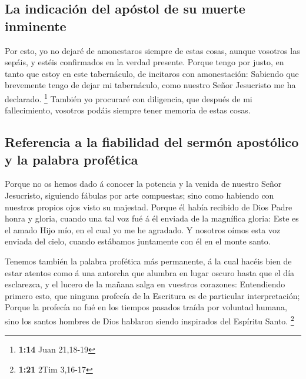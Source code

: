 \hypertarget{la-indicaciuxf3n-del-apuxf3stol-de-su-muerte-inminente}{%
\subsection{La indicación del apóstol de su muerte
inminente}\label{la-indicaciuxf3n-del-apuxf3stol-de-su-muerte-inminente}}

 Por esto, yo no dejaré de amonestaros siempre de estas
cosas, aunque vosotros las sepáis, y estéis confirmados en la verdad
presente.  Porque tengo por justo, en tanto que estoy en
este tabernáculo, de incitaros con amonestación: 
Sabiendo que brevemente tengo de dejar mi tabernáculo, como nuestro
Señor Jesucristo me ha declarado. \footnote{\textbf{1:14} Juan 21,18-19}
 También yo procuraré con diligencia, que después de mi
fallecimiento, vosotros podáis siempre tener memoria de estas cosas.

\hypertarget{referencia-a-la-fiabilidad-del-sermuxf3n-apostuxf3lico-y-la-palabra-profuxe9tica}{%
\subsection{Referencia a la fiabilidad del sermón apostólico y la
palabra
profética}\label{referencia-a-la-fiabilidad-del-sermuxf3n-apostuxf3lico-y-la-palabra-profuxe9tica}}

 Porque no os hemos dado á conocer la potencia y la
venida de nuestro Señor Jesucristo, siguiendo fábulas por arte
compuestas; sino como habiendo con nuestros propios ojos visto su
majestad.  Porque él había recibido de Dios Padre honra y
gloria, cuando una tal voz fué á él enviada de la magnífica gloria: Este
es el amado Hijo mío, en el cual yo me he agradado.  Y
nosotros oímos esta voz enviada del cielo, cuando estábamos juntamente
con él en el monte santo.

 Tenemos también la palabra profética más permanente, á
la cual hacéis bien de estar atentos como á una antorcha que alumbra en
lugar oscuro hasta que el día esclarezca, y el lucero de la mañana salga
en vuestros corazones:  Entendiendo primero esto, que
ninguna profecía de la Escritura es de particular interpretación;
 Porque la profecía no fué en los tiempos pasados traída
por voluntad humana, sino los santos hombres de Dios hablaron siendo
inspirados del Espíritu Santo. \footnote{\textbf{1:21} 2Tim 3,16-17}

